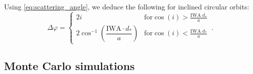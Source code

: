 \documentclass[
    usenatbib,
]{mnras}
\newcommand{\IWA}{\ensuremath{\mathrm{IWA}}}
\begin{document}

Using \cref{eq:scattering_angle}, we deduce the following for inclined circular orbits: 
\begin{equation}
\label{eq:Delta_phi_max}
    \Delta \varphi = 
    \begin{cases}
        2 i & \textrm{for} \cos(i) > \frac{\mathrm{IWA}\; d_* }{a} \\ 
        2 \cos^{-1}\left(\dfrac{\mathrm{IWA}\cdot d_* }{a}\right) & \textrm{for} \cos(i) < \frac{\mathrm{IWA}\; d_* }{a}
    \end{cases} \,.
\end{equation}





\subsection{Monte Carlo simulations}
\label{subsec:2.3}
\end{document}
